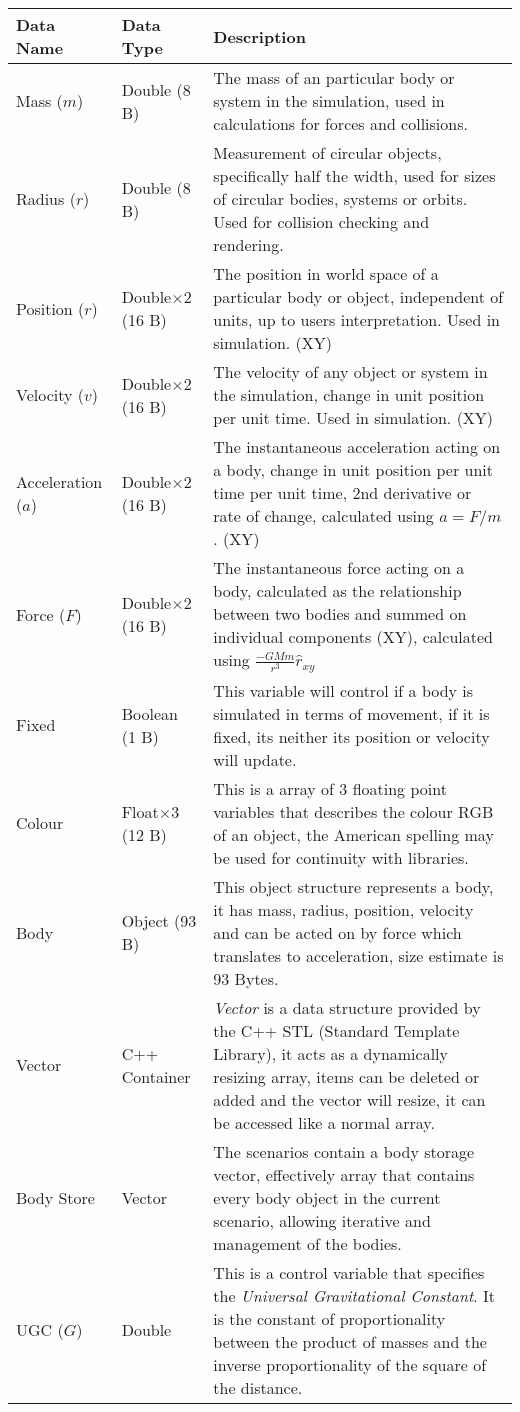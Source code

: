 \begin{table}[H]
\centering
\footnotesize
\def\arraystretch{1.5}
\begin{tabular}{|M{3cm}|M{3cm}|m{8cm}|}
\hline 
\textbf{Data Name} & \textbf{Data Type} & \textbf{Description} \\ \hline
Mass ($m$) & Double (8 B) & The mass of an particular body or system in the simulation, used in calculations for forces and collisions. \\ \hline
Radius ($r$) & Double (8 B) & Measurement of circular objects, specifically half the width, used for sizes of circular bodies, systems or orbits. Used for collision checking and rendering. \\ \hline
Position ($r$) & Double$\times2$ (16 B) & The position in world space of a particular body or object, independent of units, up to users interpretation. Used in simulation. (XY) \\ \hline
Velocity ($v$) & Double$\times2$ (16 B) & The velocity of any object or system in the simulation, change in unit position per unit time. Used in simulation. (XY) \\ \hline
Acceleration ($a$) & Double$\times2$ (16 B) & The instantaneous acceleration acting on a body, change in unit position per unit time per unit time, 2nd derivative or rate of change, calculated using $a=F/m$. (XY) \\ \hline
Force ($F$) & Double$\times2$ (16 B) & The instantaneous force acting on a body, calculated as the relationship between two bodies and summed on individual components (XY), calculated using $\frac{-GMm}{r^3}\hat{r}_{xy}$ \\ \hline
Fixed & Boolean (1 B) & This variable will control if a body is simulated in terms of movement, if it is fixed, its neither its position or velocity will update. \\ \hline
Colour & Float$\times3$ (12 B) & This is a array of 3 floating point variables that describes the colour RGB of an object, the American spelling may be used for continuity with libraries. \\ \hline
Body & Object (93 B) & This object structure represents a body, it has mass, radius, position, velocity and can be acted on by force which translates to acceleration, size estimate is 93 Bytes. \\ \hline
Vector & C++ Container & \textit{Vector} is a data structure provided by the C++ STL (Standard Template Library), it acts as a dynamically resizing array, items can be deleted or added and the vector will resize, it can be accessed like a normal array. \\ \hline
Body Store & Vector & The scenarios contain a body storage vector, effectively array that contains every body object in the current scenario, allowing iterative and management of the bodies. \\ \hline
UGC ($G$) & Double & This is a control variable that specifies the \textit{Universal Gravitational Constant}. It is the constant of proportionality between the product of masses and the inverse proportionality of the square of the distance. \\ \hline
\end{tabular}
\end{table} 

